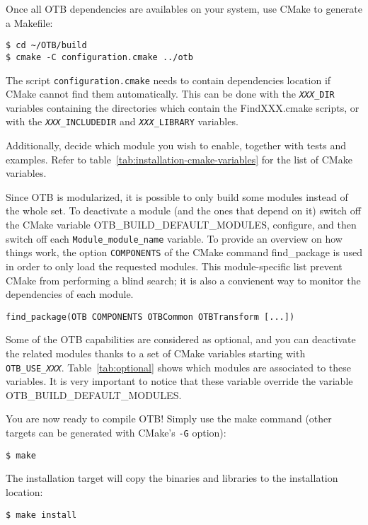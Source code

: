 Once all OTB dependencies are availables on your system, use CMake to generate a Makefile:
\begin{verbatim}
$ cd ~/OTB/build
$ cmake -C configuration.cmake ../otb
\end{verbatim}
The script \texttt{configuration.cmake} needs to contain dependencies location if CMake cannot find them automatically.
This can be done with the \texttt{\textit{XXX}\_DIR} variables containing the directories which contain the
FindXXX.cmake scripts, or with the \texttt{\textit{XXX}\_INCLUDEDIR} and \texttt{\textit{XXX}\_LIBRARY} variables.

Additionally, decide which module you wish to enable, together with tests and examples.
Refer to table~\ref{tab:installation-cmake-variables} for the list of CMake variables.

Since OTB is modularized, it is possible to only build some modules instead of the whole set. 
To deactivate a module (and the ones that depend on it) switch off the CMake variable OTB\_BUILD\_DEFAULT\_MODULES,
configure, and then switch off each \texttt{Module\_module\_name} variable.
To provide an overview on how things work, the option \texttt{COMPONENTS} of the CMake command find\_package is used in
order to only load the requested modules.
This module-specific list prevent CMake from performing a blind search; it is also a convienent way to monitor the
dependencies of each module.
\begin{verbatim}
find_package(OTB COMPONENTS OTBCommon OTBTransform [...])
\end{verbatim} 

Some of the OTB capabilities are considered as optional, and you can deactivate the related modules thanks to a set of
CMake variables starting with \texttt{OTB\_USE\_\textit{XXX}}.
Table~\ref{tab:optional} shows which modules are associated to these variables. It is very important to notice that
these variable override the variable OTB\_BUILD\_DEFAULT\_MODULES.

You are now ready to compile OTB!
Simply use the make command (other targets can be generated with CMake's \texttt{-G} option):
\begin{verbatim}
$ make
\end{verbatim}

The installation target will copy the binaries and libraries to the installation location:
\begin{verbatim}
$ make install
\end{verbatim}

